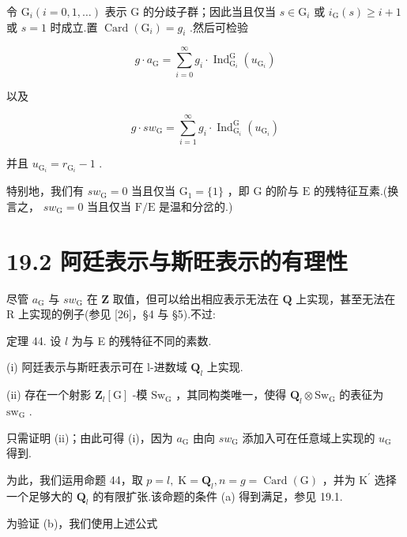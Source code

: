 \documentclass[10pt]{article}
\begin{document}
令 \({\mathrm{G}}_{i}\left( {i = 0,1,\ldots }\right)\) 表示 \(\mathrm{G}\) 的分歧子群；因此当且仅当 \(s \in  {\mathrm{G}}_{i}\) 或 \({i}_{\mathrm{G}}\left( s\right)  \geq  i + 1\) 或 \(s = 1\) 时成立.置 \(\operatorname{Card}\left( {\mathrm{G}}_{i}\right)  = {g}_{i}\) .然后可检验

\[
g \cdot  {a}_{\mathrm{G}} = \mathop{\sum }\limits_{{i = 0}}^{\infty }{g}_{i} \cdot  {\operatorname{Ind}}_{{\mathrm{G}}_{i}}^{\mathrm{G}}\left( {u}_{{\mathrm{G}}_{i}}\right)
\]

以及

\[
g \cdot  s{w}_{\mathrm{G}} = \mathop{\sum }\limits_{{i = 1}}^{\infty }{g}_{i} \cdot  {\operatorname{Ind}}_{{\mathrm{G}}_{i}}^{\mathrm{G}}\left( {u}_{{\mathrm{G}}_{i}}\right)
\]

并且 \({u}_{{\mathrm{G}}_{i}} = {r}_{{\mathrm{G}}_{i}} - 1\) .

特别地，我们有 \(s{w}_{\mathrm{G}} = 0\) 当且仅当 \({\mathrm{G}}_{1} = \{ 1\}\) ，即 \(\mathrm{G}\) 的阶与 \(\mathrm{E}\) 的残特征互素.(换言之， \(s{w}_{\mathrm{G}} = 0\) 当且仅当 \(\mathrm{F}/\mathrm{E}\) 是温和分岔的.)

\section*{19.2 阿廷表示与斯旺表示的有理性}

尽管 \({a}_{\mathrm{G}}\) 与 \(s{w}_{\mathrm{G}}\) 在 \(\mathbf{Z}\) 取值，但可以给出相应表示无法在 \(\mathbf{Q}\) 上实现，甚至无法在 R 上实现的例子(参见 [26]，§4 与 §5).不过:

定理 44. 设 \(l\) 为与 E 的残特征不同的素数.

(i) 阿廷表示与斯旺表示可在 l-进数域 \({\mathbf{Q}}_{l}\) 上实现.

(ii) 存在一个射影 \({\mathbf{Z}}_{l}\left\lbrack  \mathrm{G}\right\rbrack\) -模 \({\mathrm{{Sw}}}_{\mathrm{G}}\) ，其同构类唯一，使得 \({\mathbf{Q}}_{l} \otimes  {\mathrm{{Sw}}}_{\mathrm{G}}\) 的表征为 \({\mathrm{{sw}}}_{\mathrm{G}}\) .

只需证明 (ii)；由此可得 (i)，因为 \({a}_{\mathrm{G}}\) 由向 \(s{w}_{\mathrm{G}}\) 添加入可在任意域上实现的 \({u}_{\mathrm{G}}\) 得到.

为此，我们运用命题 44，取 \(p = l,\mathrm{\;K} = {\mathbf{Q}}_{l},n = g = \operatorname{Card}\left( \mathrm{G}\right)\) ，并为 \({\mathrm{K}}^{\prime }\) 选择一个足够大的 \({\mathbf{Q}}_{l}\) 的有限扩张.该命题的条件 (a) 得到满足，参见 19.1.

为验证 (b)，我们使用上述公式
\end{document}
